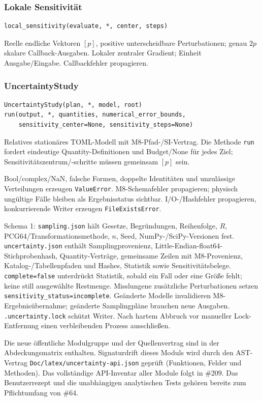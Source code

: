 \subsubsection*{Lokale Sensitivität}
\begin{lstlisting}
local_sensitivity(evaluate, *, center, steps)
\end{lstlisting}
Reelle endliche Vektoren $[p]$, positive unterscheidbare Perturbationen;
genau $2p$ skalare Callback-Ausgaben. Lokaler zentraler Gradient;
Einheit Ausgabe/Eingabe. Callbackfehler propagieren.
\subsubsection*{UncertaintyStudy}
\begin{lstlisting}
UncertaintyStudy(plan, *, model, root)
run(output, *, quantities, numerical_error_bounds,
    sensitivity_center=None, sensitivity_steps=None)
\end{lstlisting} Relatives stationäres TOML-Modell
mit M8-Pfad-/SI-Vertrag. Die Methode \texttt{run}
fordert eindeutige Quantity-Definitionen und Budget/None für jedes Ziel;
Sensitivitätszentrum/-schritte müssen gemeinsam $[p]$ sein.

Bool/complex/NaN, falsche Formen, doppelte Identitäten und unzulässige
Verteilungen erzeugen \texttt{ValueError}. M8-Schemafehler propagieren;
physisch ungültige Fälle bleiben als Ergebnisstatus sichtbar. I/O-/Hashfehler
propagieren, konkurrierende Writer erzeugen \texttt{FileExistsError}.

Schema 1: \texttt{sampling.json} hält Gesetze, Begründungen, Reihenfolge, $R$,
PCG64/Transformationsmethode, $n$, Seed, NumPy-/SciPy-Versionen fest.
\texttt{uncertainty.json} enthält Samplingprovenienz, Little-Endian-float64-
Stichprobenhash, Quantity-Verträge, gemeinsame Zeilen mit M8-Provenienz,
Katalog-/Tabellenpfaden und Hashes, Statistik sowie Sensitivitätsbelege.
\texttt{complete=false} unterdrückt Statistik, sobald ein Fall oder eine Größe
fehlt; keine still ausgewählte Restmenge. Misslungene zusätzliche Perturbationen
setzen \texttt{sensitivity\_status=incomplete}. Geänderte Modelle invalidieren
M8-Ergebnisübernahme; geänderte Samplingpläne brauchen neue Ausgaben.
\texttt{.uncertainty.lock} schützt Writer. Nach hartem Abbruch vor manueller
Lock-Entfernung einen verbleibenden Prozess ausschließen.

Die neue öffentliche Modulgruppe und der Quellenvertrag sind in der
Abdeckungsmatrix enthalten. Signaturdrift dieses Moduls wird durch den AST-Vertrag
\nolinkurl{Doc/latex/uncertainty-api.json} geprüft (Funktionen, Felder und Methoden).
Das vollständige API-Inventar aller Module folgt in \#209. Das Benutzerrezept und die unabhängigen
analytischen Tests gehören bereits zum Pflichtumfang von \#64.

\endgroup
